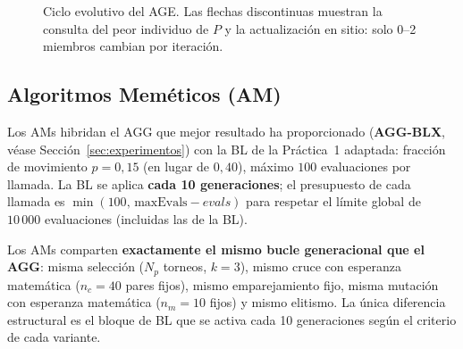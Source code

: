 \documentclass[12pt,a4paper]{article}
\begin{document}
\begin{figure}[H]
\centering
{}
\caption{Ciclo evolutivo del AGE. Las flechas discontinuas muestran la consulta del peor
individuo de $P$ y la actualización en sitio: solo 0--2 miembros cambian por iteración.}
\label{fig:age_cycle}
\end{figure}

\subsection{Algoritmos Meméticos (AM)}

Los AMs hibridan el AGG que mejor resultado ha proporcionado (\textbf{AGG-BLX},
véase Sección~\ref{sec:experimentos}) con la BL de la Práctica~1 adaptada:
fracción de movimiento $p=0{,}15$ (en lugar de $0{,}40$), máximo $100$ evaluaciones
por llamada. La BL se aplica \textbf{cada 10 generaciones}; el presupuesto de cada llamada
es $\min(100,\,\text{maxEvals}-evals)$ para respetar el límite global de $10\,000$
evaluaciones (incluidas las de la BL).

Los AMs comparten \textbf{exactamente el mismo bucle generacional que el AGG}: misma
selección ($N_p$ torneos, $k=3$), mismo cruce con esperanza matemática ($n_c=40$ pares fijos),
mismo emparejamiento fijo, misma mutación con esperanza matemática ($n_m=10$ fijos) y
mismo elitismo. La única diferencia estructural es el bloque de BL que se activa
cada 10 generaciones según el criterio de cada variante.
\end{document}
